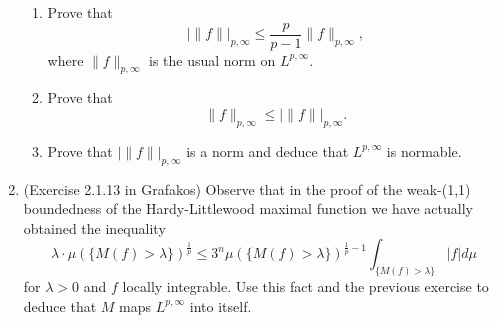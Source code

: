 \documentclass[a4paper]{article}
\begin{document}
\begin{enumerate}
    \begin{enumerate}
      \item Prove that
        \[ | \| f \| |_{p,\infty} \leq \frac{p}{p-1} \|f\|_{p,\infty} ,\]
        where $\|f\|_{p,\infty}$ is the usual norm on $L^{p,\infty}$.

      \item Prove that
        \[ \|f\|_{p,\infty} \leq | \| f \| |_{p,\infty} .\]

      \item Prove that $| \| f \| |_{p,\infty}$ is a norm and deduce that $L^{p,\infty}$ is normable.
    \end{enumerate}

  \item (Exercise 2.1.13 in Grafakos) Observe that in the proof of the weak-(1,1) boundedness of the Hardy-Littlewood maximal function we have
    actually obtained the inequality
    \[ \lambda \cdot \mu( \{ M(f) > \lambda \} )^{\frac{1}{p}} \leq 3^n \mu( \{M(f) > \lambda \})^{\frac{1}{p} - 1} \int_{\{M(f)>\lambda\}}^{} |f|
    d\mu \]
    for $\lambda > 0$ and $f$ locally integrable. Use this fact and the previous exercise to deduce that $M$ maps $L^{p,\infty}$ into itself.
\end{enumerate}
\end{document}
